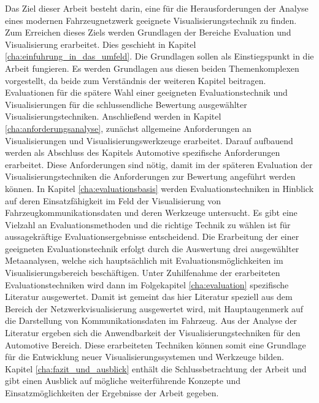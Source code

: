 \documentclass[draft=false
              ,paper=a4
              ,twoside=false
              ,fontsize=11pt
              ,headsepline
              ,BCOR10mm
              ,DIV11
              ]{scrbook}
\begin{document}



Das Ziel dieser Arbeit besteht darin, eine für die Herausforderungen der Analyse eines modernen Fahrzeugnetzwerk geeignete Visualisierungstechnik zu finden. Zum Erreichen dieses Ziels werden Grundlagen der Bereiche Evaluation und Visualisierung erarbeitet. Dies geschieht in Kapitel \ref{cha:einfuhrung_in_das_umfeld}. Die Grundlagen sollen als Einstiegspunkt in die Arbeit fungieren. Es werden Grundlagen aus diesen beiden Themenkomplexen vorgestellt, da beide zum Verständnis der weiteren Kapitel beitragen. Evaluationen für die spätere Wahl einer geeigneten Evaluationstechnik und Visualisierungen für die schlussendliche Bewertung ausgewählter Visualisierungstechniken. Anschließend werden in Kapitel \ref{cha:anforderungsanalyse}, zunächst allgemeine Anforderungen an Visualisierungen und Visualisierungswerkzeuge erarbeitet. Darauf aufbauend werden als Abschluss des Kapitels Automotive spezifische Anforderungen erarbeitet. Diese Anforderungen sind nötig, damit im der späteren Evaluation der Visualisierungstechniken die Anforderungen zur Bewertung angeführt werden können.
In Kapitel \ref{cha:evaluationsbasis} werden Evaluationstechniken in Hinblick auf deren Einsatzfähigkeit im Feld der Visualisierung von Fahrzeugkommunikationsdaten und deren Werkzeuge untersucht. Es gibt eine Vielzahl an Evaluationsmethoden und die richtige Technik zu wählen ist für aussagekräftige Evaluationsergebnisse entscheidend. Die Erarbeitung der einer geeigneten Evaluationstechnik erfolgt durch die Auswertung drei ausgewählter Metaanalysen, welche sich hauptsächlich mit Evaluationsmöglichkeiten im Visualisierungsbereich beschäftigen. Unter Zuhilfenahme der erarbeiteten Evaluationstechniken wird dann im Folgekapitel \ref{cha:evaluation} spezifische Literatur ausgewertet. Damit ist gemeint das hier Literatur speziell aus dem Bereich der Netzwerkvisualisierung ausgewertet wird, mit Hauptaugenmerk auf die Darstellung von Kommunikationsdaten im Fahrzeug. Aus der Analyse der Literatur ergeben sich die Anwendbarkeit der Visualisierungstechniken für den Automotive Bereich. Diese erarbeiteten Techniken können somit eine Grundlage für die Entwicklung neuer Visualisierungssystemen und Werkzeuge bilden. Kapitel \ref{cha:fazit_und_ausblick} enthält die Schlussbetrachtung der Arbeit und gibt einen Ausblick auf mögliche weiterführende Konzepte und Einsatzmöglichkeiten der Ergebnisse der Arbeit gegeben. 
\end{document}
